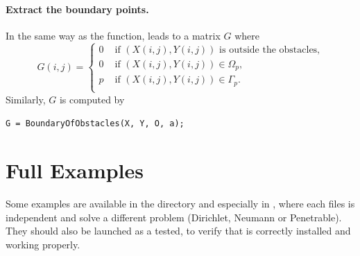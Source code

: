 \paragraph{Extract the boundary points.} In the same way as the  function,  leads to a matrix $G$ where
$$
G(i,j) = \begin{cases}
0 & \text{ if } (X(i,j),Y(i,j)) \text{ is outside the obstacles,}\\
0 & \text{ if } (X(i,j),Y(i,j)) \in\Omega_p,\\
p & \text{ if } (X(i,j),Y(i,j)) \in\Gamma_p.\\
\end{cases}
$$
Similarly, $G$ is computed by
\begin{lstlisting}
G = BoundaryOfObstacles(X, Y, O, a);
\end{lstlisting}

\section{Full Examples}

Some examples are available in the  directory and especially in , where each files is independent and solve a different problem (Dirichlet, Neumann or Penetrable). They should also be launched as a tested, to verify that \mudiff is correctly installed and working properly.











